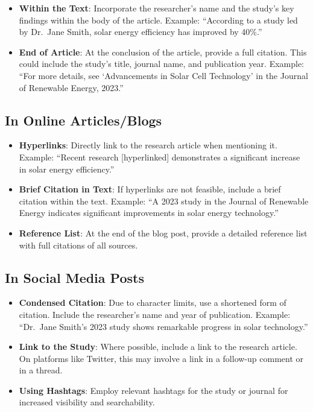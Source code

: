 \documentclass[
]{book}
\begin{document}
\begin{itemize}
\item
  \textbf{Within the Text}: Incorporate the researcher's name and the study's key findings within the body of the article. Example: ``According to a study led by Dr.~Jane Smith, solar energy efficiency has improved by 40\%.''
\item
  \textbf{End of Article}: At the conclusion of the article, provide a full citation. This could include the study's title, journal name, and publication year. Example: ``For more details, see `Advancements in Solar Cell Technology' in the Journal of Renewable Energy, 2023.''
\end{itemize}

\hypertarget{in-online-articlesblogs}{%
\subsection*{In Online Articles/Blogs}\label{in-online-articlesblogs}}

\begin{itemize}
\item
  \textbf{Hyperlinks}: Directly link to the research article when mentioning it. Example: ``Recent research {[}hyperlinked{]} demonstrates a significant increase in solar energy efficiency.''
\item
  \textbf{Brief Citation in Text}: If hyperlinks are not feasible, include a brief citation within the text. Example: ``A 2023 study in the Journal of Renewable Energy indicates significant improvements in solar energy technology.''
\item
  \textbf{Reference List}: At the end of the blog post, provide a detailed reference list with full citations of all sources.
\end{itemize}

\hypertarget{in-social-media-posts}{%
\subsection*{In Social Media Posts}\label{in-social-media-posts}}

\begin{itemize}
\item
  \textbf{Condensed Citation}: Due to character limits, use a shortened form of citation. Include the researcher's name and year of publication. Example: ``Dr.~Jane Smith's 2023 study shows remarkable progress in solar technology.''
\item
  \textbf{Link to the Study}: Where possible, include a link to the research article. On platforms like Twitter, this may involve a link in a follow-up comment or in a thread.
\item
  \textbf{Using Hashtags}: Employ relevant hashtags for the study or journal for increased visibility and searchability.
\end{itemize}
\end{document}
